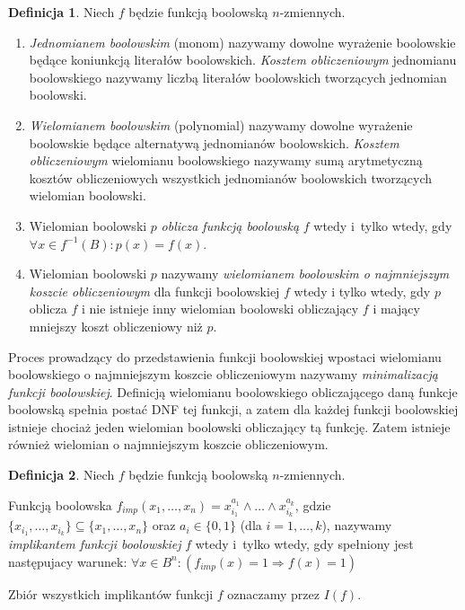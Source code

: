 \documentclass[a4paper,11pt,twoside]{article}
\theoremstyle{definition}
\newtheorem{df}{Definicja}
\begin{document}
\begin{df}
Niech $f$ będzie funkcją boolowską $n$-zmiennych.
\begin{enumerate}
\item {\em Jednomianem boolowskim} (monom) nazywamy dowolne wyrażenie boolowskie będące koniunkcją literałów boolowskich. {\em Kosztem obliczeniowym} jednomianu boolowskiego nazywamy liczbą literałów boolowskich tworzących jednomian boolowski.
\item {\em Wielomianem boolowskim} (polynomial) nazywamy dowolne wyrażenie boolowskie będące alternatywą jednomianów boolowskich. {\em Kosztem obliczeniowym} wielomianu boolowskiego nazywamy sumą arytmetyczną kosztów obliczeniowych wszystkich jednomianów boolowskich tworzących wielomian boolowski.
\item Wielomian boolowski $p$ {\em oblicza funkcją boolowską} $f$ wtedy i~tylko wtedy, gdy\\ $\forall x \in f^{-1}(B)\colon p(x) = f(x)$.
\item Wielomian boolowski $p$ nazywamy {\em wielomianem boolowskim o najmniejszym koszcie obliczeniowym} dla funkcji boolowskiej $f$ wtedy i tylko wtedy, gdy $p$ oblicza $f$ i nie istnieje inny wielomian boolowski obliczający $f$ i mający mniejszy koszt obliczeniowy niż $p$.
\end{enumerate}
\end{df}

Proces prowadzący do przedstawienia funkcji boolowskiej wpostaci wielomianu boolowskiego o najmniejszym koszcie obliczeniowym nazywamy {\em minimalizacją funkcji boolowskiej}. Definicją wielomianu boolowskiego obliczającego daną funkcje boolowską spełnia postać DNF tej funkcji, a zatem dla każdej funkcji boolowskiej istnieje chociaż jeden wielomian boolowski obliczający tą funkcję. Zatem istnieje również wielomian o najmniejszym koszcie obliczeniowym. 

\begin{df}
Niech $f$ będzie funkcją boolowską $n$-zmiennych. 
\end{df}

Funkcją boolowska $f_{imp}(x_1,\dots,x_n) = x_{i_1}^{a_1} \wedge \dots \wedge x_{i_k}^{a_k}$, gdzie $\{x_{i_1},\dots,x_{i_k}\} \subseteq \{x_{1},\dots,x_{n}\}$ oraz $a_i \in \{0,1\}$ (dla $i=1,\dots,k$), nazywamy {\em implikantem funkcji boolowskiej} $f$ wtedy i~tylko wtedy, gdy spełniony jest następujacy warunek: $\forall x \in B^n \colon (f_{imp}(x) = 1 \Rightarrow f(x) = 1)$

Zbiór wszystkich implikantów funkcji $f$ oznaczamy przez $I(f)$.
\end{document}
